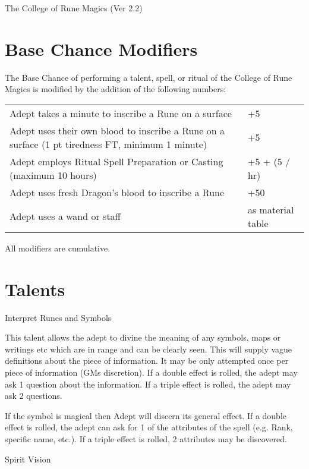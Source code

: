 \begin{Chapter}{The College of Rune Magics (Ver 2.2)}
\section{Base Chance Modifiers}

The Base Chance of performing a talent, spell, or ritual of the
College of Rune Magics is modified by the addition of the following
numbers:
\begin{tabularx}{\columnwidth}{Xl}
Adept takes a minute to inscribe a Rune on a surface & +5 \\
Adept uses their own blood to inscribe a Rune on a surface (1 pt tiredness FT, minimum 1 minute) & +5 \\
Adept employs Ritual Spell Preparation or Casting (maximum 10 hours) & +5  + (5 / hr) \\
Adept uses fresh Dragon’s blood to inscribe a Rune  & +50 \\
Adept uses a wand or staff  & as material table \\
\end{tabularx}

All modifiers are cumulative. 

\section{Talents}

\begin{talent}[T-1]{Interpret Runes and Symbols}

\begin{effects}
This talent allows the adept to divine the meaning of any symbols,
maps or writings etc which are in range and can be clearly seen.  This
will supply vague definitions about the piece of information.  It may
be only attempted once per piece of information (GMs discretion).  If
a double effect is rolled, the adept may ask 1 question about the
information. If a triple effect is rolled, the adept may ask 2
questions.

If the symbol is magical then Adept will discern its general
effect. If a double effect is rolled, the adept can ask for 1 of the
attributes of the spell (e.g.  Rank, specific name, etc.).  If a
triple effect is rolled, 2 attributes may be discovered.
\end{effects}
\end{talent}

\begin{talent}[T-2]{Spirit Vision}


\end{talent}
\end{Chapter}
